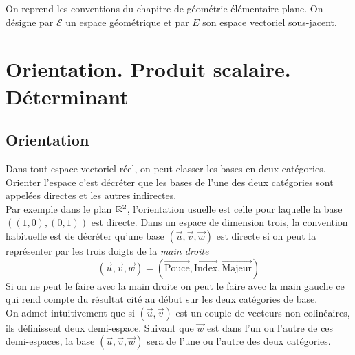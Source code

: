 

On reprend les conventions du chapitre de géométrie élémentaire plane. On désigne par $\mathcal E$ un espace géométrique et par $E$ son espace vectoriel sous-jacent.
\section{Orientation. Produit scalaire. Déterminant}
\subsection{Orientation}
Dans tout espace vectoriel réel, on peut classer les bases en deux catégories. Orienter l'espace c'est décréter que les bases de l'une des deux catégories sont appelées directes et les autres indirectes.\\
Par exemple dans le plan $\mathbb{R}^2$, l'orientation usuelle est celle pour laquelle la base $((1,0),(0,1))$ est directe. Dans un espace de dimension trois, la convention habituelle est de décréter qu'une base $(\overrightarrow u ,\overrightarrow v ,\overrightarrow w)$ est directe si on peut la représenter par les trois doigts de la \emph{main droite}
\begin{displaymath}
 (\overrightarrow u ,\overrightarrow v ,\overrightarrow w)
=
(\overrightarrow{\text{Pouce}},\overrightarrow{\text{Index}},\overrightarrow{\text{Majeur}})
\end{displaymath}
Si on ne peut le faire avec la main droite on peut le faire avec la main gauche ce qui rend compte du résultat cité au début sur les deux catégories de base.\\
On admet intuitivement que si $(\overrightarrow u ,\overrightarrow v)$ est un couple de vecteurs non colinéaires, ils définissent deux demi-espace. Suivant que $\overrightarrow w$ est dans l'un ou l'autre de ces demi-espaces, la base $(\overrightarrow u ,\overrightarrow v ,\overrightarrow w)$ sera de l'une ou l'autre des deux catégories.

